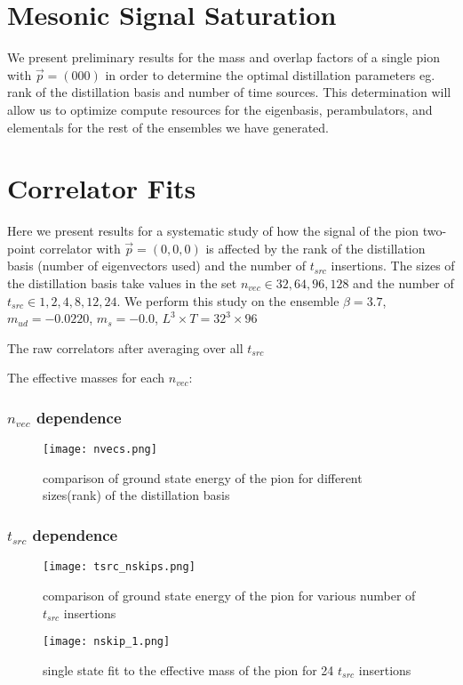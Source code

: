 \section{Mesonic Signal Saturation}

We present preliminary results for the mass and overlap factors of a single pion with $\vec{p} = (000)$ in order to determine the optimal distillation parameters eg. rank of the distillation basis and number of time sources. This determination will allow us to optimize compute resources for the eigenbasis, perambulators, and elementals for the rest of the ensembles  we have generated. 
\section{Correlator Fits}

Here we present results for a systematic study of how the signal of the pion two-point correlator with $\vec{p}=(0,0,0)$ is affected by the rank of the distillation basis (number of eigenvectors used) and the number of $t_{src}$ insertions. The sizes of the distillation basis take values in the set $n_{vec}\in {32,64,96,128}$ and the number of $t_{src} \in {1,2,4,8,12,24}$. We perform this study on the ensemble $\beta = 3.7$, $m_{ud}=-0.0220$, $m_s = -0.0$, $L^3 \times T = 32^3\times96$

The raw correlators after averaging over all $t_{src}$ 

The effective masses for each $n_{vec}$: 


\subsubsection{$n_{vec}$ dependence}

\begin{figure}[h]
    \texttt{[image: nvecs.png]}
    \caption{comparison of ground state energy of the pion for different sizes(rank) of the distillation basis}
    \label{fig:figure2}
    \end{figure}

\subsubsection{$t_{src}$ dependence}
\begin{figure}[h]
    \texttt{[image: tsrc\_nskips.png]}
    \caption{comparison of ground state energy of the pion for various number of $t_{src}$ insertions}
    \label{fig:figure3}
    \end{figure}
\begin{figure}[h]
    \texttt{[image: nskip\_1.png]}
    \caption{single state fit to the effective mass of the pion for 24 $t_{src}$ insertions}
    \label{fig:figure4}
    \end{figure}
    
